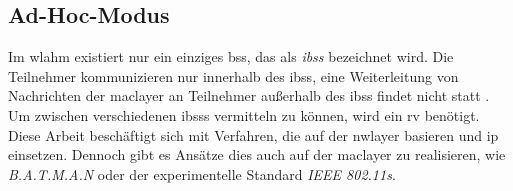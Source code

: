 \subsection{Ad-Hoc-Modus}
\label{chapter:grundlagen:wlan:adhoc}

Im \gls{wlahm} existiert nur ein einziges \gls{bss}, das als \textit{\gls{ibss}} bezeichnet wird. Die Teilnehmer kommunizieren nur innerhalb des \gls{ibss}, eine Weiterleitung von Nachrichten der \gls{maclayer} an Teilnehmer außerhalb des \gls{ibss} findet nicht statt \cite{Crow97}\cite{Basagni04}. Um zwischen verschiedenen \glspl{ibss} 
vermitteln zu können, wird ein \gls{rv} benötigt. Diese Arbeit beschäftigt sich mit Verfahren, die auf der \gls{nwlayer} basieren und \gls{ip} einsetzen. Dennoch gibt es Ansätze dies auch auf der \gls{maclayer} zu realisieren, wie \zB \textit{B.A.T.M.A.N} \cite{Johnson08} oder der experimentelle Standard \textit{IEEE 802.11s}.

